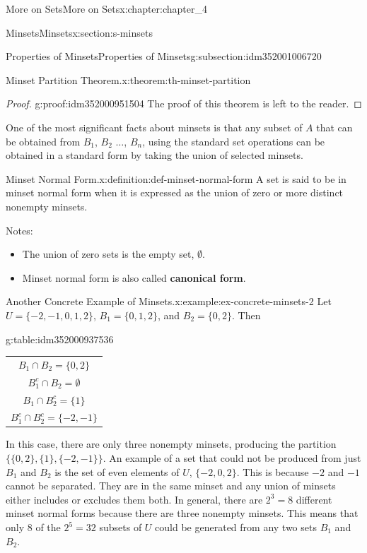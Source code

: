 \documentclass[oneside,10pt,]{book}
\newcommand{\tabularfont}{\relax}
\newcommand{\terminology}[1]{\textbf{#1}}
\begin{document}
\begin{chapterptx}{More on Sets}{}{More on Sets}{}{}{x:chapter:chapter_4}
\begin{sectionptx}{Minsets}{}{Minsets}{}{}{x:section:s-minsets}
\begin{subsectionptx}{Properties of Minsets}{}{Properties of Minsets}{}{}{g:subsection:idm352001006720}
\begin{theorem}{Minset Partition Theorem.}{}{x:theorem:th-minset-partition}
\end{theorem}
\begin{proof}{}{g:proof:idm352000951504}
The proof of this theorem is left to the reader.%
\end{proof}
One of the most significant facts about minsets is that any subset of \(A\) that can be obtained from  \(B_1\), \(B_2\) \(\ldots\), \(B_n\), using the standard set operations can be obtained in a standard form by taking the union of selected minsets.%
\begin{definition}{Minset Normal Form.}{x:definition:def-minset-normal-form}%
%
A set is said to be in minset normal form when it is expressed as the union of zero or more distinct nonempty minsets.%
\end{definition}
Notes:%
\par
%
\begin{itemize}[label=\textbullet]
\item{}The union of zero sets is the empty set, \(\emptyset\).%
\item{}Minset normal form is also called \terminology{canonical form}.%
\end{itemize}
%
\begin{example}{Another Concrete Example of Minsets.}{x:example:ex-concrete-minsets-2}%
Let \(U = \{-2,-1,0,1,2\}\), \(B_1= \{0,1,2\}\), and \(B_2= \{0,2\}\).  Then%
\begin{tableptx}{\textbf{}}{g:table:idm352000937536}{}%
\centering
{\tabularfont%
\begin{tabular}{c}
\(B_1\cap B_2=\{0,2\}\)\tabularnewline[0pt]
\(B_1^c\cap B_2 = \emptyset\)\tabularnewline[0pt]
\(B_1\cap B_2^c = \{1\}\)\tabularnewline[0pt]
\(B_1^c\cap B_2^c = \{-2,-1\}\)
\end{tabular}
}%
\end{tableptx}%
In this case, there are only three nonempty minsets, producing the partition \(\{\{0,2\},\{1\},\{-2,-1\}\}\). An example of a set that could not be produced from just \(B_1\) and \(B_2\) is the set of even elements of \(U\), \(\{-2,0,2\}\). This is because \(-2\) and \(-1\) cannot be separated. They are in the same minset and any union of minsets either includes or excludes them both.  In general, there are \(2^3= 8\) different minset normal forms because there are three nonempty minsets. This means that only 8 of the \(2^5=32\) subsets of \(U\) could be generated from  any two sets \(B_1\) and \(B_2\).%
\end{example}
\end{subsectionptx}

\end{sectionptx}
\end{chapterptx}
\end{document}
